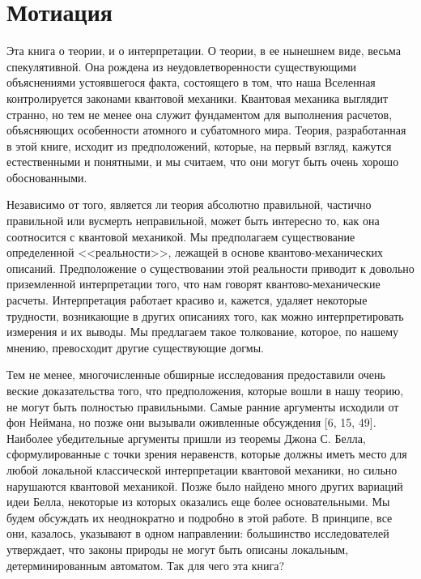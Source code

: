 \documentclass[main.tex]{subfiles}
\begin{document}
\section{Мотиация}\label{ch1}

Эта книга о теории, и о интерпретации. О теории, в ее нынешнем виде, весьма спекулятивной. Она рождена из неудовлетворенности существующими объяснениями устоявшегося факта, состоящего в том, что наша Вселенная контролируется законами квантовой механики. Квантовая механика выглядит странно, но тем не менее она служит фундаментом для выполнения расчетов, объясняющих особенности атомного и субатомного мира. Теория, разработанная в этой книге, исходит из предположений, которые, на первый взгляд, кажутся естественными и понятными, и мы считаем, что они могут быть очень хорошо обоснованными. 

Независимо от того, является ли теория абсолютно правильной, частично правильной или вусмерть неправильной, может быть интересно то, как она соотносится с квантовой механикой. Мы предполагаем существование определенной <<реальности>>, лежащей в основе квантово-механических описаний. Предположение о существовании этой реальности приводит к довольно приземленной интерпретации того, что нам говорят квантово-механические расчеты. Интерпретация работает красиво и, кажется, удаляет некоторые трудности, возникающие в других описаниях того, как можно интерпретировать измерения и их выводы. Мы предлагаем такое толкование, которое, по нашему мнению, превосходит другие существующие догмы. 

Тем не менее, многочисленные обширные исследования предоставили очень веские доказательства того, что предположения, которые вошли в нашу теорию, не могут быть полностью правильными. Самые ранние аргументы исходили от фон Неймана, но позже они вызывали оживленные обсуждения [6, 15, 49]. Наиболее убедительные аргументы пришли из теоремы Джона С. Белла, сформулированные с точки зрения неравенств, которые должны иметь место для любой локальной классической интерпретации квантовой механики, но сильно нарушаются квантовой механикой. Позже было найдено много других вариаций идеи Белла, некоторые из которых оказались еще более основательными. Мы будем обсуждать их неоднократно и подробно в этой работе. В принципе, все они, казалось, указывают в одном направлении: большинство исследователей утверждает, что законы природы не могут быть описаны локальным, детерминированным автоматом. Так для чего эта книга? 
\end{document}
